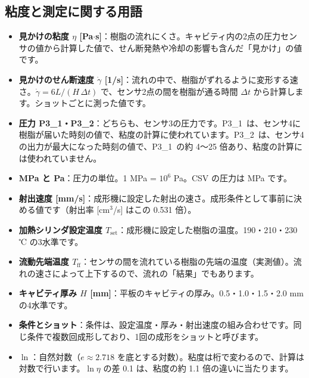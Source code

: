\documentclass[paper=a4paper,fontsize=10.5pt,line_length=44zw,number_of_lines=38]{jlreq}
\newcommand{\gd}{\dot{\gamma}}
\newcommand{\PI}{P3\_1}
\newcommand{\PII}{P3\_2}
\newcommand{\Tff}{T_{\mathrm{ff}}}
\newcommand{\Tset}{T_{\mathrm{set}}}
\newenvironment{termlist}{\begin{itemize}[label=・,leftmargin=1\zw,labelwidth=1\zw,labelsep=0pt,itemsep=0.4ex,topsep=0.6ex,parsep=0pt]}{\end{itemize}}
\newcommand{\term}[1]{\item \textbf{#1}：}
\begin{document}
\subsection{粘度と測定に関する用語}
\begin{termlist}
\term{見かけの粘度 $\eta$ [Pa$\cdot$s]}樹脂の流れにくさ。キャビティ内の2点の圧力センサの値から計算した値で、せん断発熱や冷却の影響も含んだ「見かけ」の値です。
\term{見かけのせん断速度 $\gd$ [1/s]}流れの中で、樹脂がずれるように変形する速さ。$\gd = 6L/(H\,\Delta t)$ で、センサ2点の間を樹脂が通る時間 $\Delta t$ から計算します。ショットごとに測った値です。
\term{圧力 \PI・\PII}どちらも、センサ3の圧力です。\PI\ は、センサ4に樹脂が届いた時刻の値で、粘度の計算に使われています。\PII\ は、センサ4の出力が最大になった時刻の値で、\PI\ の約 4〜25 倍あり、粘度の計算には使われていません。
\term{MPa と Pa}圧力の単位。1 MPa = $10^6$ Pa。CSV の圧力は MPa です。
\term{射出速度 [mm/s]}成形機に設定した射出の速さ。成形条件として事前に決める値です（射出率 [cm$^3$/s] はこの 0.531 倍）。
\term{加熱シリンダ設定温度 $\Tset$}成形機に設定した樹脂の温度。190・210・230 ℃ の3水準です。
\term{流動先端温度 $\Tff$}センサの間を流れている樹脂の先端の温度（実測値）。流れの速さによって上下するので、流れの「結果」でもあります。
\term{キャビティ厚み $H$ [mm]}平板のキャビティの厚み。0.5・1.0・1.5・2.0 mm の4水準です。
\term{条件とショット}条件は、設定温度・厚み・射出速度の組み合わせです。同じ条件で複数回成形しており、1回の成形をショットと呼びます。
\term{$\ln$}自然対数（$e \approx 2.718$ を底とする対数）。粘度は桁で変わるので、計算は対数で行います。$\ln\eta$ の差 0.1 は、粘度の約 1.1 倍の違いに当たります。
\end{termlist}
\end{document}
